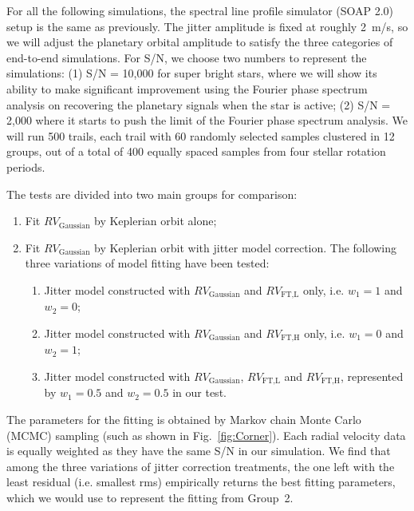 For all the following simulations, the spectral line profile simulator (SOAP 2.0) setup is the same as previously. The jitter amplitude is fixed at roughly 2~m/s, so we will adjust the planetary orbital amplitude to satisfy the three categories of end-to-end simulations. For S/N, we choose two numbers to represent the simulations: (1) S/N = 10,000 for super bright stars, where we will show its ability to make significant improvement using the Fourier phase spectrum analysis on recovering the planetary signals when the star is active; (2) S/N = 2,000 where it starts to push the limit of the Fourier phase spectrum analysis. We will run 500 trails, each trail with 60 randomly selected samples clustered in 12 groups, out of a total of 400 equally spaced samples from four stellar rotation periods. 

The tests are divided into two main groups for comparison:
\begin{enumerate}
	\item Fit $RV_\text{Gaussian}$ by Keplerian orbit alone;
	\item Fit $RV_\text{Gaussian}$ by Keplerian orbit with jitter model correction. The following three variations of model fitting have been tested:
   \begin{enumerate}
     \item Jitter model constructed with $RV_\text{Gaussian}$ and $RV_\text{FT,L}$ only, i.e. $w_1=1$ and $w_2=0$;
     \item Jitter model constructed with $RV_\text{Gaussian}$ and $RV_\text{FT,H}$ only, i.e. $w_1=0$ and $w_2=1$;
     \item Jitter model constructed with $RV_\text{Gaussian}$, $RV_\text{FT,L}$ and $RV_\text{FT,H}$, represented by $w_1=0.5$ and $w_2=0.5$ in our test. 
   \end{enumerate}
\end{enumerate}
The parameters for the fitting is obtained by Markov chain Monte Carlo (MCMC) sampling (such as shown in Fig.~\ref{fig:Corner}). Each radial velocity data is equally weighted as they have the same S/N in our simulation. We find that among the three variations of jitter correction treatments, the one left with the least residual (i.e. smallest rms) empirically returns the best fitting parameters, which we would use to represent the fitting from Group~2. 

